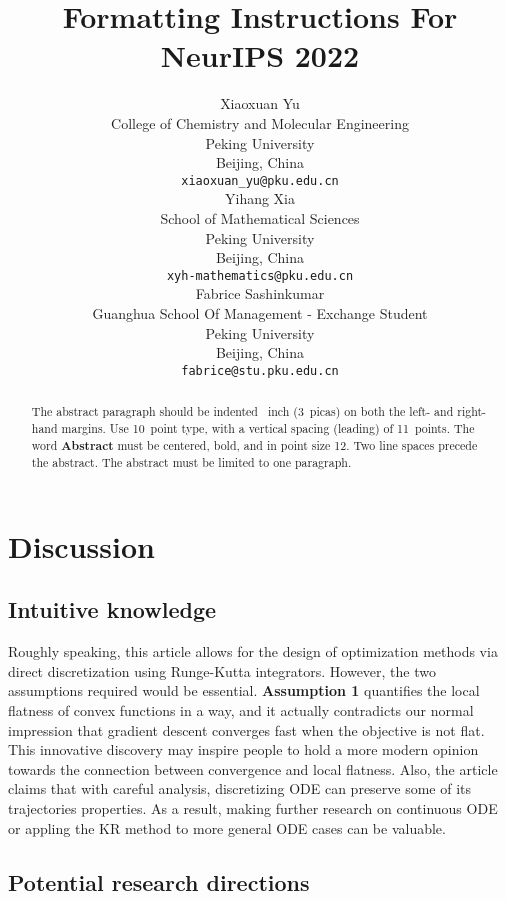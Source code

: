 \documentclass{article}
\title{Formatting Instructions For NeurIPS 2022}
\author{%
  Xiaoxuan Yu \\
  College of Chemistry and Molecular Engineering\\
  Peking University\\
  Beijing, China \\
  \texttt{xiaoxuan\_yu@pku.edu.cn} \\
  \And
  Yihang Xia \\
  School of Mathematical Sciences \\
  Peking University \\
  Beijing, China\\
  \texttt{xyh-mathematics@pku.edu.cn} \\
  
  \AND
  Fabrice Sashinkumar \\
  Guanghua School Of Management - Exchange Student  \\
  Peking University \\
  Beijing, China \\
  \texttt{fabrice@stu.pku.edu.cn} \\
}
\begin{document}
\maketitle


\begin{abstract}
  The abstract paragraph should be indented ~inch (3~picas) on
  both the left- and right-hand margins. Use 10~point type, with a vertical
  spacing (leading) of 11~points.  The word \textbf{Abstract} must be centered,
  bold, and in point size 12. Two line spaces precede the abstract. The abstract
  must be limited to one paragraph.
\end{abstract}



\section{Discussion}

\subsection{Intuitive knowledge}

Roughly speaking, this article allows for the design of optimization
methods via direct discretization using Runge-Kutta integrators. However, the two
assumptions required would be essential. \textbf{Assumption 1} quantifies the local flatness
of convex functions in a way, and it actually contradicts our normal impression that
gradient descent converges fast when the objective is not flat. This innovative discovery
may inspire people to hold a more modern opinion towards the connection between
convergence and local flatness. Also, the article claims that with careful
analysis, discretizing ODE can preserve some of its trajectories properties.
As a result, making further research on continuous ODE or appling the KR method to
more general ODE cases can be valuable.

\subsection{Potential research directions}
\end{document}
